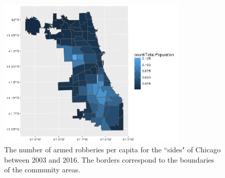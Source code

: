\documentclass{article} %
\begin{document}
\begin{figure}[h]
\begin{center}

\includegraphics[width=0.8\textwidth,keepaspectratio]{Plots/counts_by_pop.png}
\caption{The number of armed robberies per capita for the ``sides" of Chicago between 2003 and 2016.  The borders correspond to  the boundaries of the community areas.}
\label{counts}
\end{center}
\end{figure}
\end{document}
